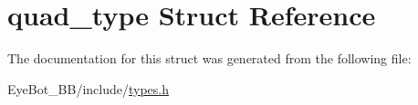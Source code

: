\hypertarget{structquad__type}{\section{quad\-\_\-type \-Struct \-Reference}
\label{structquad__type}
}


\-The documentation for this struct was generated from the following file\-:\begin{DoxyCompactItemize}
\item 
\-Eye\-Bot\-\_\-\-B\-B/include/\hyperlink{types_8h}{types.\-h}\end{DoxyCompactItemize}
